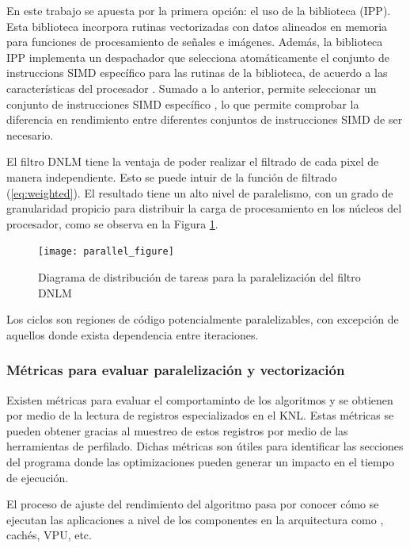 En este trabajo se apuesta por la primera opción: el uso de la biblioteca  (IPP). Esta biblioteca incorpora rutinas vectorizadas con datos alineados en memoria para funciones de procesamiento de se\~nales e imágenes. Además, la biblioteca IPP implementa un despachador que selecciona atomáticamente el conjunto de instruccions SIMD específico para las rutinas de la biblioteca, de acuerdo a las características del procesador \cite{IntelCorporation2017}.  Sumado a lo anterior, permite seleccionar un conjunto de instrucciones SIMD específico \cite{IntelCorporation2017}, lo que permite comprobar la diferencia en rendimiento entre diferentes conjuntos de instrucciones SIMD de ser necesario.

El filtro DNLM tiene la ventaja de poder realizar el filtrado de cada pixel de manera independiente. Esto se puede intuir de la función de filtrado (\ref{eq:weighted}). El resultado tiene un alto nivel de paralelismo, con un grado de granularidad propicio para distribuir la carga de procesamiento en los núcleos del procesador, como se observa en la Figura \ref{fig:parallel_figure}. 



\begin{figure}[htb]
   \centering
   \caption[Diagrama de distribución de tareas paralelas]{Diagrama de distribución de tareas para la paralelización del filtro DNLM}
   \texttt{[image: parallel\_figure]}
   \label{fig:parallel_figure}
 \end{figure}
 
 
 Los ciclos son regiones de código potencialmente paralelizables, con excepción de aquellos donde exista dependencia entre iteraciones. 
 
\subsubsection{Métricas para evaluar paralelización y vectorización}
 
Existen métricas para evaluar el comportaminto de los algoritmos y se obtienen por medio de la lectura de registros especializados en el KNL. Estas métricas se pueden obtener gracias al muestreo de estos registros por medio de las herramientas de perfilado. Dichas métricas son útiles para identificar las secciones del programa donde las optimizaciones pueden generar un impacto en el tiempo de ejecución.

El proceso de ajuste del rendimiento del algoritmo pasa por conocer cómo se ejecutan las aplicaciones a nivel de los componentes en la arquitectura como , cachés, VPU, etc.

